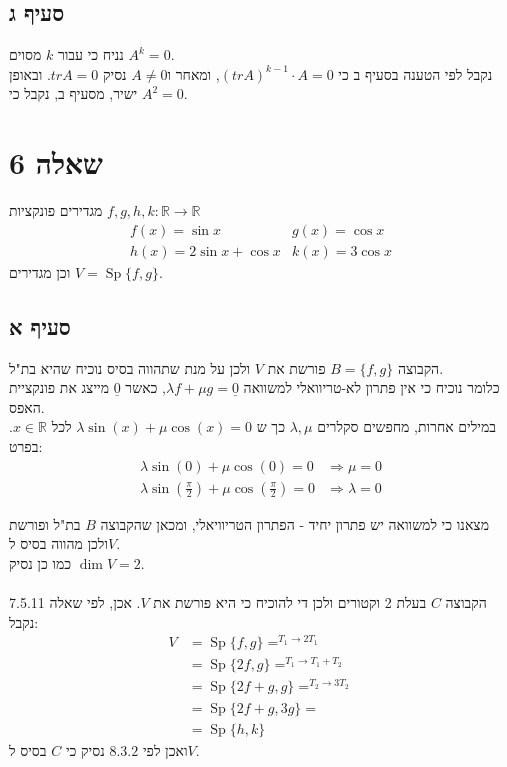 \documentclass{article}
\DeclareMathOperator*{\equals}{=}
\DeclareMathOperator\Sp{Sp}
\def\reals{\mathbb{R}}
\def\zerovec{\underline{0}}
\begin{document}
\subsection*{סעיף ג}

נניח כי עבור $k$ מסוים $A^k=0$. \\
נקבל לפי הטענה בסעיף ב כי $(tr A)^{k-1} \cdot A=0$, ומאחר ו$A\ne 0$ נסיק $tr A=0$.
ובאופן ישיר, מסעיף ב, נקבל כי $A^2=0$.

\pagebreak

\section*{שאלה 6}

מגדירים פונקציות $f,g,h,k: \reals \rightarrow \reals$
\[
    \begin{matrix}
        f(x)= \sin x         & g(x)=\cos x  \\
        h(x)=2\sin x+ \cos x & k(x)=3\cos x
    \end{matrix}
\]
וכן מגדירים $V=\Sp\{ f, g \}$.

\subsection*{סעיף א}

הקבוצה $B=\{ f,g \}$ פורשת את $V$ ולכן על מנת שתהווה בסיס נוכיח שהיא בת"ל. \\
כלומר נוכיח כי אין פתרון לא-טריוואלי למשוואה $\lambda f + \mu g = \zerovec$,
כאשר $\zerovec$ מייצג את פונקציית האפס. \\
במילים אחרות, מחפשים סקלרים $\lambda, \mu$ כך ש $\lambda \sin(x)+\mu \cos(x)=0$ לכל $x\in \reals$. בפרט: \\
\begin{align*}
    \lambda \sin(0)+\mu \cos(0)=0                             & \Rightarrow \mu =0    \\
    \lambda \sin(\frac{\pi}{2}) + \mu \cos(\frac{\pi}{2}) = 0 & \Rightarrow \lambda=0
\end{align*}

מצאנו כי למשוואה יש פתרון יחיד - הפתרון הטריוויאלי, ומכאן שהקבוצה $B$ בת"ל ופורשת ולכן מהווה בסיס ל$V$.\\
כמו כן נסיק $\dim V = 2$. \\\\
הקבוצה $C$ בעלת 2 וקטורים ולכן די להוכיח כי היא פורשת את $V$. אכן, לפי שאלה 7.5.11 נקבל:
\begin{align*}
    V & =\Sp\{ f, g \}\equals^{T_1\rightarrow 2T_1}     \\
      & =\Sp\{ 2f, g \}\equals^{T_1\rightarrow T_1+T_2} \\
      & =\Sp\{ 2f+g, g \}\equals^{T_2\rightarrow 3T_2}  \\
      & =\Sp\{ 2f+g, 3g \}=                             \\
      & =\Sp\{ h, k \}
\end{align*}
ואכן לפי $8.3.2$ נסיק כי $C$ בסיס ל$V$.
\end{document}
